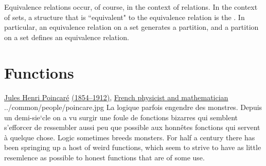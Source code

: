 \begin{definition}
\label{def:eqclass}
\end{definition}

Equivalence relations occur, of course, in the context of relations.
In the context of sets, a structure that is ``equivalent" to the equivalence relation
is the .
In particular, an equivalence relation on a set generates a partition,
and a partition on a set defines an equivalence relation.

\section{Functions}
\qboxnpqt
  { \href{http://www-history.mcs.st-andrews.ac.uk/Biographies/Poincare.html}{Jules Henri Poincar\'e} 
    \href{http://www-history.mcs.st-andrews.ac.uk/Timelines/TimelineF.html}{(1854--1912)}, 
    \href{http://www-history.mcs.st-andrews.ac.uk/BirthplaceMaps/Places/France.html}{French physicist and mathematician}
    \footnotemark
  }
  {../common/people/poincare.jpg}
  {La logique parfois engendre des monstres. 
   Depuis un demi-sie`cle on a vu surgir une foule de fonctions bizarres qui 
   semblent s'efforcer de ressembler aussi peu que possible aux honn\^etes 
   fonctions qui servent \`a quelque chose.}
  {Logic sometimes breeds monsters. 
   For half a century there has been springing up a host of weird functions, 
   which seem to strive to have as little resemlence as possible to honest functions
   that are of some use.}

